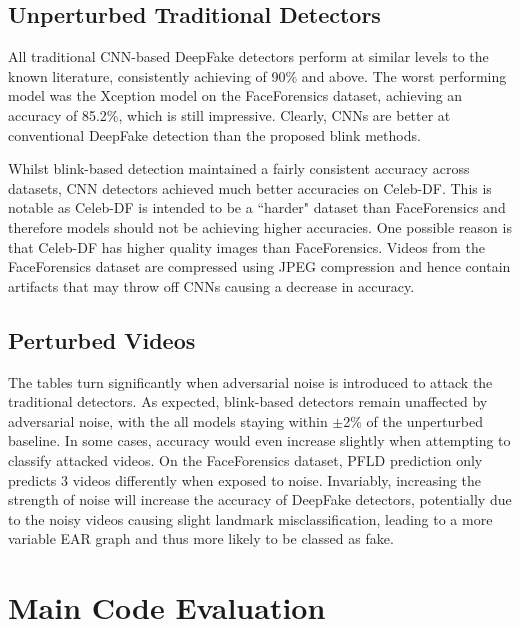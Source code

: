 \subsection{Unperturbed Traditional Detectors}

All traditional CNN-based DeepFake detectors perform at similar levels to the known literature, consistently achieving of 90\% and above. The worst performing model was the Xception model on the FaceForensics dataset, achieving an accuracy of 85.2\%, which is still impressive. Clearly, CNNs are better at conventional DeepFake detection than the proposed blink methods. 

Whilst blink-based detection maintained a fairly consistent accuracy across datasets, CNN detectors achieved much better accuracies on Celeb-DF. This is notable as Celeb-DF is intended to be a ``harder" dataset than FaceForensics\cite{li2020celeb} and therefore models should not be achieving higher accuracies. One possible reason is that Celeb-DF has higher quality images than FaceForensics. Videos from the FaceForensics dataset are compressed using JPEG compression\cite{roessler2018faceforensics} and hence contain artifacts that may throw off CNNs causing a decrease in accuracy.

\subsection{Perturbed Videos}

The tables turn significantly when adversarial noise is introduced to attack the traditional detectors. As expected, blink-based detectors remain unaffected by adversarial noise, with the all models staying within $\pm$2\% of the unperturbed baseline. In some cases, accuracy would even increase slightly when attempting to classify attacked videos. On the FaceForensics dataset, PFLD prediction only predicts 3 videos differently when exposed to noise. Invariably, increasing the strength of noise will increase the accuracy of DeepFake detectors, potentially due to the noisy videos causing slight landmark misclassification, leading to a more variable EAR graph and thus more likely to be classed as fake. 

\section{Main Code Evaluation}

